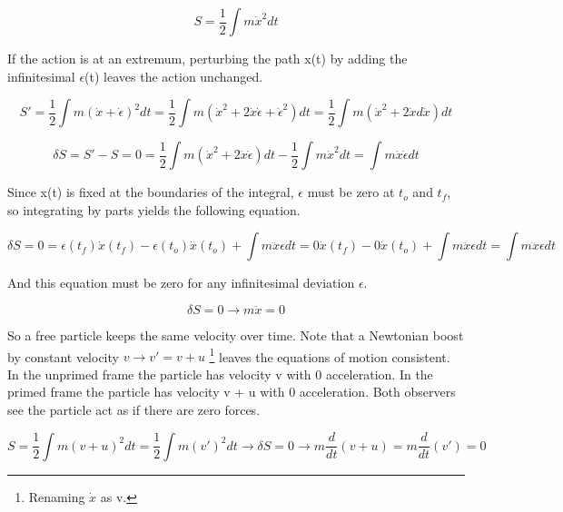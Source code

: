 \begin{equation}
S = \frac{1}{2} \int m\dot{x}^2 dt
\end{equation}

If the action is at an extremum, perturbing the path x(t) by adding the infinitesimal $\epsilon$(t) leaves the action unchanged.

\begin{equation}
S' = \frac{1}{2} \int m(\dot{x} + \dot{\epsilon})^2 dt = \frac{1}{2} \int m(\dot{x}^2 + 2\dot{x}\dot{\epsilon} + \dot{\epsilon}^2) dt =  
\frac{1}{2} \int m(\dot{x}^2 + 2\dot{x}d\dot{x}) dt 
\end{equation}

\begin{equation}
\delta S = S' - S = 0 = \frac{1}{2} \int m(\dot{x}^2 + 2\dot{x}\dot{\epsilon}) dt - \frac{1}{2} \int m\dot{x}^2 dt = \int m\dot{x}\dot{\epsilon} dt
\end{equation}

Since x(t) is fixed at the boundaries of the integral, $\epsilon$ must be zero at $t_o$ and $t_f$, so integrating by parts yields the following equation. 

\begin{equation}
\delta S = 0 = \epsilon(t_f) \dot{x}(t_f)  - \epsilon(t_o) \dot{x}(t_o) + \int m\ddot{x} \epsilon dt  = 
0\dot{x}(t_f)  - 0\dot{x}(t_o) + \int m\ddot{x} \epsilon dt = \int m\ddot{x} \epsilon dt
\end{equation}

And this equation must be zero for any infinitesimal deviation $\epsilon$.

\begin{equation}
\delta S = 0 \rightarrow m\ddot{x} = 0
\end{equation}

So a free particle keeps the same velocity over time. Note that a Newtonian boost by constant velocity $v \rightarrow v' = v + u$ \footnote{Renaming $\dot{x}$ as v.} leaves the equations of motion consistent. In the unprimed frame the particle has velocity v with 0 acceleration. In the primed frame the particle has velocity v + u with 0 acceleration. Both observers see the particle act as if there are zero forces.

\begin{equation}
S = \frac{1}{2} \int m(v + u)^2 dt  =  \frac{1}{2} \int m(v')^2 dt \rightarrow \delta S = 0 \rightarrow m\frac{d}{dt}(v+u) = m\frac{d}{dt}(v') = 0 
\end{equation}

